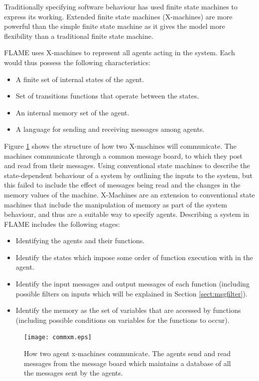 \documentclass[a4paper,11pt]{article}
\begin{document}
Traditionally specifying software behaviour has used finite state
machines to express its working. Extended finite state machines
(X-machines) are more powerful than the simple finite state machine
as it gives the model more flexibility than a traditional finite
state machine.

FLAME uses X-machines to represent all agents acting in the system.
Each would thus possess the following characteristics:

\begin{itemize}
\item A finite set of internal states of the agent.
\item Set of transitions functions that operate between the states.
\item An internal memory set of the agent.
\item A language for sending and receiving messages among agents.
\end{itemize}

Figure \ref{fig:commxm} shows the structure of how two X-machines
will communicate. The machines communicate through a common message
board, to which they post and read from their messages. Using
conventional state machines to describe the state-dependent
behaviour of a system by outlining the inputs to the system, but
this failed to include the effect of messages being read and the
changes in the memory values of the machine. X-Machines are an
extension to conventional state machines that include the
manipulation of memory as part of the system behaviour, and thus are
a suitable way to specify agents. Describing a system in FLAME
includes the following stages:

\begin{itemize}
\item Identifying the agents and their functions.
\item Identify the states which impose some order of function
execution with in the agent.
\item Identify the input messages and output messages of each function
(including possible filters on inputs which will be explained in
Section \ref{sect:msgfilter}).
\item Identify the memory as the set of variables that are accessed by
functions (including possible conditions on variables for the
functions to occur).
\end{itemize}



\begin{figure}[!htb]
\begin{center}
  \texttt{[image: commxm.eps]}
  \caption{How two agent x-machines communicate. The agents send and read messages from the message board which maintains a database of all the messages sent by the agents.}
  \label{fig:commxm}
  \end{center}
\end{figure}
\end{document}
